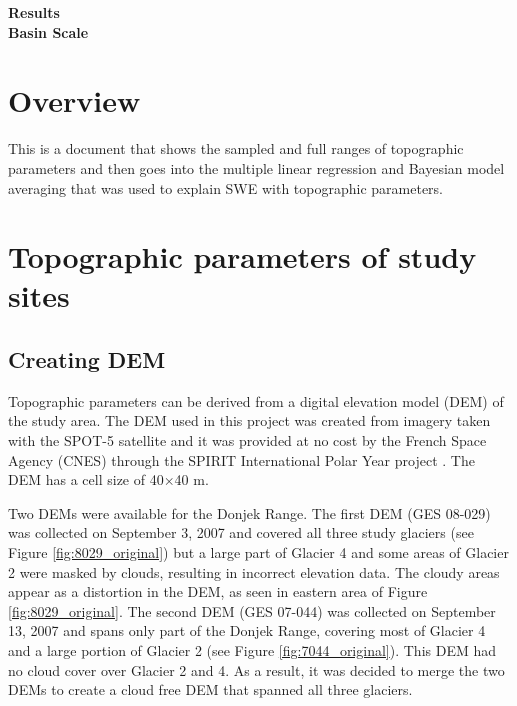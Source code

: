 \documentclass[12pt]{article}
\begin{document}

\begin{center}
\Large \textbf{Results\\ Basin Scale}
\end{center}

\section*{Overview}
This is a document that shows the sampled and full ranges of topographic parameters and then goes into the multiple linear regression and Bayesian model averaging that was used to explain SWE with topographic parameters. 

\tableofcontents
\pagebreak

\section{Topographic parameters of study sites}

\subsection{Creating DEM}

Topographic parameters can be derived from a digital elevation model (DEM) of the study area. The DEM used in this project was created from imagery taken with the SPOT-5 satellite and it was provided at no cost by the French Space Agency (CNES) through the SPIRIT International Polar Year project \citep{Korona2009}. The DEM has a cell size of 40$\times$40 m. 

Two DEMs were available for the Donjek Range. The first DEM (GES 08-029) was collected on September 3, 2007 and covered all three study glaciers (see Figure \ref{fig:8029_original}) but a large part of Glacier 4 and some areas of Glacier 2 were masked by clouds, resulting in incorrect elevation data. The cloudy areas appear as a distortion in the DEM, as seen in eastern area of Figure \ref{fig:8029_original}. The second DEM (GES 07-044) was collected on September 13, 2007 and spans only part of the Donjek Range, covering most of Glacier 4 and a large portion of Glacier 2 (see Figure \ref{fig:7044_original}). This DEM had no cloud cover over Glacier 2 and 4. As a result, it was decided to merge the two DEMs to create a cloud free DEM that spanned all three glaciers. 
\end{document}
